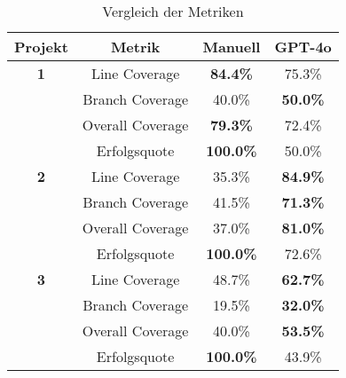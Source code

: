 \bgroup
\def\arraystretch{2}
\begin{table}[h]
	\vspace{.5cm}
	\centering		
	\begin{center}
		\begin{tabular}{|c||c|c|c|}
			\hline 
			Projekt & Metrik & Manuell & GPT-4o \\
			\hline 
			\hline
			\textbf{1} & Line Coverage & \textbf{84.4\%} & 75.3\% \\
			\hline
			& Branch Coverage & 40.0\% & \textbf{50.0\%} \\
			\hline
			& Overall Coverage & \textbf{79.3\%} & 72.4\% \\
			\hline
			& Erfolgsquote & \textbf{100.0\%} & 50.0\% \\
			\hline
			\hline
			\textbf{2} & Line Coverage & 35.3\% & \textbf{84.9\%} \\
			\hline
			& Branch Coverage & 41.5\% & \textbf{71.3\%} \\
			\hline
			& Overall Coverage & 37.0\% & \textbf{81.0\%} \\
			\hline
			& Erfolgsquote & \textbf{100.0\%} & 72.6\%\\
			\hline
			\hline
			\textbf{3} & Line Coverage & 48.7\% & \textbf{62.7\%} \\
			\hline
			& Branch Coverage & 19.5\% & \textbf{32.0\%} \\
			\hline
			& Overall Coverage & 40.0\% & \textbf{53.5\%} \\
			\hline
			& Erfolgsquote & \textbf{100.0\%} & 43.9\% \\
			\hline
		\end{tabular} 
	\end{center}
	\caption{Vergleich der Metriken}
	\label{fig:comp}
\end{table}
\egroup
